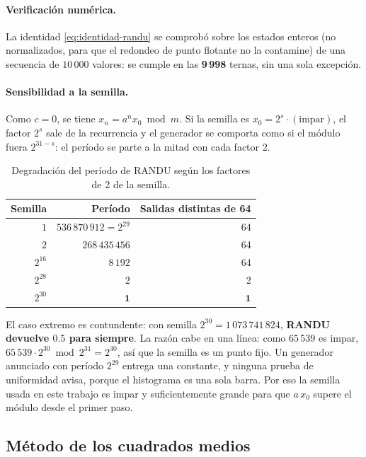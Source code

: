 \paragraph{Verificación numérica.} La identidad \eqref{eq:identidad-randu} se
comprobó sobre los estados enteros (no normalizados, para que el redondeo de
punto flotante no la contamine) de una secuencia de $10\,000$ valores: se
cumple en las \textbf{9\,998} ternas, sin una sola excepción.

\paragraph{Sensibilidad a la semilla.} Como $c = 0$, se tiene
$x_n = a^n x_0 \bmod m$. Si la semilla es $x_0 = 2^s\cdot(\text{impar})$, el
factor $2^s$ sale de la recurrencia y el generador se comporta como si el
módulo fuera $2^{31-s}$: el período se parte a la mitad con cada factor 2.

\begin{table}[H]
\centering\small
\begin{tabular}{rrr}
\toprule
Semilla & Período & Salidas distintas de 64 \\
\midrule
$1$      & $536\,870\,912 = 2^{29}$ & 64 \\
$2$      & $268\,435\,456$ & 64 \\
$2^{16}$ & $8\,192$ & 64 \\
$2^{28}$ & $2$ & 2 \\
$2^{30}$ & $\mathbf{1}$ & $\mathbf{1}$ \\
\bottomrule
\end{tabular}
\caption{Degradación del período de RANDU según los factores de 2 de la
semilla.}
\label{tab:randu-semillas}
\end{table}

El caso extremo es contundente: con semilla $2^{30} = 1\,073\,741\,824$,
\textbf{RANDU devuelve $0.5$ para siempre}. La razón cabe en una línea: como
$65\,539$ es impar, $65\,539 \cdot 2^{30} \bmod 2^{31} = 2^{30}$, así que la
semilla es un punto fijo. Un generador anunciado con período $2^{29}$ entrega
una constante, y ninguna prueba de uniformidad avisa, porque el histograma es
una sola barra. Por eso la semilla usada en este trabajo es impar y
suficientemente grande para que $a\,x_0$ supere el módulo desde el primer paso.

\subsection{Método de los cuadrados medios}

